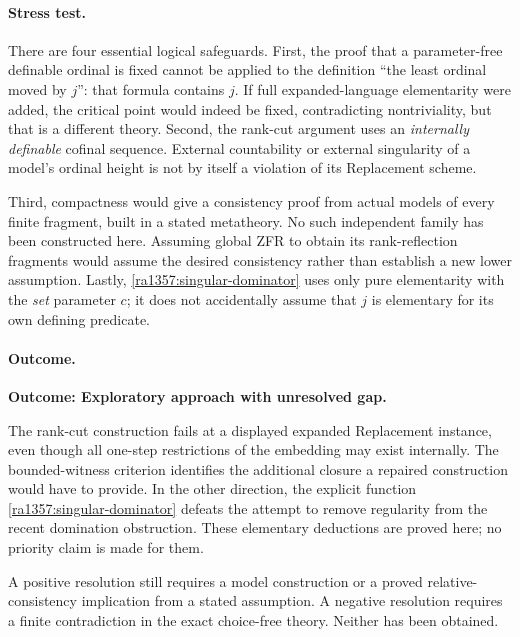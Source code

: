 \documentclass[11pt]{article}
\begin{document}
\paragraph{Stress test.}
There are four essential logical safeguards.  First, the proof that a
parameter-free definable ordinal is fixed cannot be applied to the definition
``the least ordinal moved by $j$'': that formula contains $j$.  If full
expanded-language elementarity were added, the critical point would indeed
be fixed, contradicting nontriviality, but that is a different theory.
Second, the rank-cut argument uses an \emph{internally definable} cofinal
sequence.  External countability or external singularity of a model's ordinal
height is not by itself a violation of its Replacement scheme.

Third, compactness would give a consistency proof from actual models of every
finite fragment, built in a stated metatheory.  No such independent family
has been constructed here.  Assuming global ZFR to obtain its rank-reflection
fragments would assume the desired consistency rather than establish a new
lower assumption.  Lastly, \eqref{ra1357:singular-dominator} uses only pure
elementarity with the \emph{set} parameter $c$; it does not accidentally assume
that $j$ is elementary for its own defining predicate.  

\paragraph{Outcome.}
\textbf{Outcome: Exploratory approach with unresolved gap.}

The rank-cut construction fails at a displayed expanded Replacement instance,
even though all one-step restrictions of the embedding may exist internally.
The bounded-witness criterion identifies the additional closure a repaired
construction would have to provide.  In the other direction, the explicit
function \eqref{ra1357:singular-dominator} defeats the attempt to remove
regularity from the recent domination obstruction.  These elementary
deductions are proved here; no priority claim is made for them.

A positive resolution still requires a model construction or a proved
relative-consistency implication from a stated assumption.  A negative
resolution requires a finite contradiction in the exact choice-free theory.
Neither has been obtained.
\end{document}
